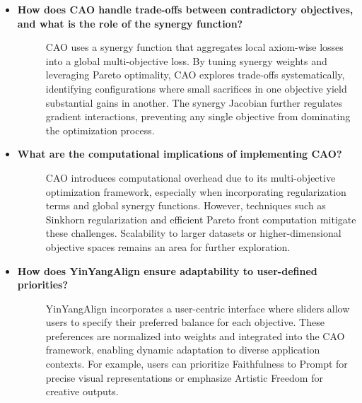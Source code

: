 \begin{itemize}[leftmargin=15pt,nolistsep]
\item[\ding{93}] { \selectfont \textbf{How does CAO handle trade-offs between contradictory objectives, and what is the role of the synergy function?}}
\vspace{0mm}
\begin{description}
\item[] CAO uses a synergy function that aggregates local axiom-wise losses into a global multi-objective loss. By tuning synergy weights and leveraging Pareto optimality, CAO explores trade-offs systematically, identifying configurations where small sacrifices in one objective yield substantial gains in another. The synergy Jacobian further regulates gradient interactions, preventing any single objective from dominating the optimization process.
\end{description}

\item[\ding{93}] { \selectfont \textbf{What are the computational implications of implementing CAO?}}
\vspace{0mm}
\begin{description}
\item[] CAO introduces computational overhead due to its multi-objective optimization framework, especially when incorporating regularization terms and global synergy functions. However, techniques such as Sinkhorn regularization and efficient Pareto front computation mitigate these challenges. Scalability to larger datasets or higher-dimensional objective spaces remains an area for further exploration.
\end{description}


\item[\ding{93}] { \selectfont \textbf{How does YinYangAlign ensure adaptability to user-defined priorities?}}
\vspace{0mm}
\begin{description}
\item[] YinYangAlign incorporates a user-centric interface where sliders allow users to specify their preferred balance for each objective. These preferences are normalized into weights and integrated into the CAO framework, enabling dynamic adaptation to diverse application contexts. For example, users can prioritize Faithfulness to Prompt for precise visual representations or emphasize Artistic Freedom for creative outputs.
\end{description}


\end{itemize}
